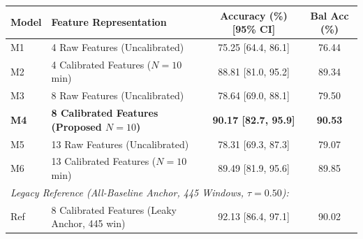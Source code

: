 \begin{tabular}{llcc}
\toprule
\textbf{Model} & \textbf{Feature Representation} & \textbf{Accuracy (\%) [95\% CI]} & \textbf{Bal Acc (\%)} \\
\midrule
M1 & 4 Raw Features (Uncalibrated)         & 75.25 [64.4, 86.1] & 76.44 \\
M2 & 4 Calibrated Features ($N=10$ min)    & 88.81 [81.0, 95.2] & 89.34 \\
M3 & 8 Raw Features (Uncalibrated)         & 78.64 [69.0, 88.1] & 79.50 \\
\textbf{M4} & \textbf{8 Calibrated Features (Proposed $N=10$)} & \textbf{90.17 [82.7, 95.9]} & \textbf{90.53} \\
M5 & 13 Raw Features (Uncalibrated)        & 78.31 [69.3, 87.3] & 79.07 \\
M6 & 13 Calibrated Features ($N=10$ min)   & 89.49 [81.9, 95.6] & 89.85 \\
\midrule
\multicolumn{4}{l}{\textit{Legacy Reference (All-Baseline Anchor, 445 Windows, $\tau=0.50$):}} \\
Ref & 8 Calibrated Features (Leaky Anchor, 445 win) & 92.13 [86.4, 97.1] & 90.02 \\
\bottomrule
\end{tabular}
